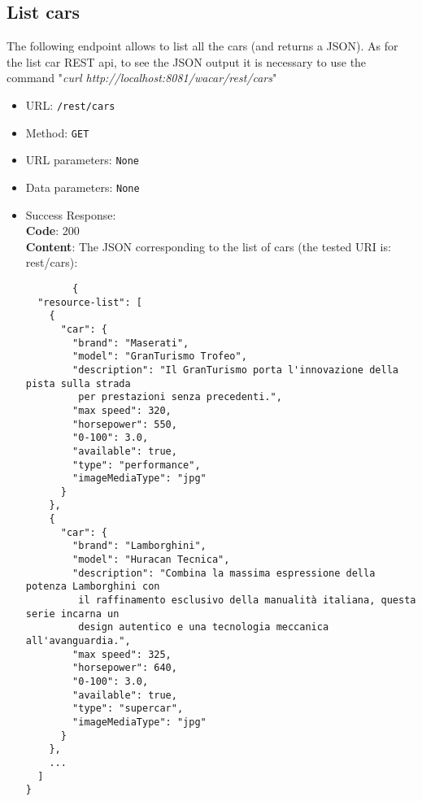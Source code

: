 \subsection*{List cars}

The following endpoint allows to list all the cars (and returns a JSON). As for the list car REST api, to see the JSON output it is necessary to use the command "\textit{curl http://localhost:8081/wacar/rest/cars}"

\begin{itemize}
    \item URL: \texttt{/rest/cars}
    \item Method: \texttt{GET}
    \item URL parameters: \texttt{None}
    \item Data parameters: \texttt{None}
    \item Success Response: \\
    \textbf{Code}: 200\\
    \textbf{Content}: The JSON corresponding to the list of cars (the tested URI is: rest/cars):
    \\\begin{verbatim}
		{
  "resource-list": [
    {
      "car": {
        "brand": "Maserati",
        "model": "GranTurismo Trofeo",
        "description": "Il GranTurismo porta l'innovazione della pista sulla strada
		 per prestazioni senza precedenti.",
        "max speed": 320,
        "horsepower": 550,
        "0-100": 3.0,
        "available": true,
        "type": "performance",
        "imageMediaType": "jpg"
      }
    },
    {
      "car": {
        "brand": "Lamborghini",
        "model": "Huracan Tecnica",
        "description": "Combina la massima espressione della potenza Lamborghini con
		 il raffinamento esclusivo della manualità italiana, questa serie incarna un 
		 design autentico e una tecnologia meccanica all'avanguardia.",
        "max speed": 325,
        "horsepower": 640,
        "0-100": 3.0,
        "available": true,
        "type": "supercar",
        "imageMediaType": "jpg"
      }
    },
	...
  ]
}



\end{verbatim}
\end{itemize}
